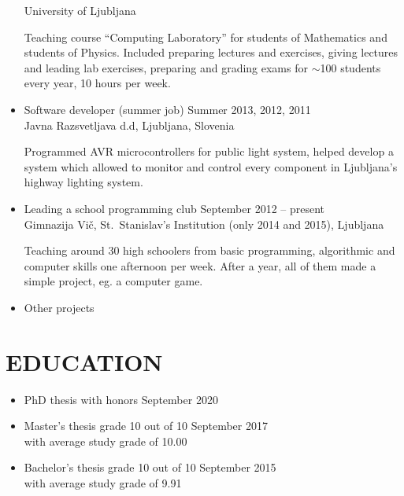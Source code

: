 \documentclass[line,margin]{res}
\newcommand{\wmeta}[1]{\sf#1\rm}
\newcommand{\wdesc}[1]{

#1

\vspace{6pt}}
\newenvironment{itemize*}{\vspace{-2.5\parskip}\begin{itemize}\setlength{\itemsep}{0pt}\setlength{\parskip}{2pt}}{\end{itemize}\vspace{-1\parskip}}
\begin{document}
\begin{itemize}
{    \hspace*{\fill}  University of Ljubljana}
  \wdesc{Teaching course ``Computing Laboratory'' for students of Mathematics and
    students of Physics. Included preparing lectures and exercises, giving
    lectures and leading lab exercises, preparing and grading exams for
    $\sim$100 students every year, 10 hours per week.}
  \item \wmeta{Software developer (summer job) \hfill Summer 2013, 2012, 2011 \\
    \hspace*{\fill} Javna Razsvetljava d.d, Ljubljana, Slovenia}
  \wdesc{Programmed AVR microcontrollers for public light system, helped
    develop a system which allowed to monitor and control every component in
    Ljubljana's highway lighting system.}
  \item \wmeta{Leading a school programming club \hfill September 2012 -- present \\
    \hspace*{\fill} Gimnazija Vič, St.\ Stanislav's Institution (only 2014 and 2015), Ljubljana}
  \wdesc{Teaching around 30 high schoolers from basic programming, algorithmic
    and computer skills one afternoon per week. After a year, all of them made a
    simple project, eg. a computer game.}
  \item \wmeta{Other projects}
\end{itemize}

\section{EDUCATION}

\begin{itemize}
  \item PhD thesis with honors  \hfill September 2020
  \item Master's thesis grade 10 out of 10 \hfill September 2017 \\
  with average study grade of 10.00
  \item Bachelor's thesis grade 10 out of 10 \hfill September 2015 \\
  with average study grade of 9.91
\end{itemize}
\end{document}
